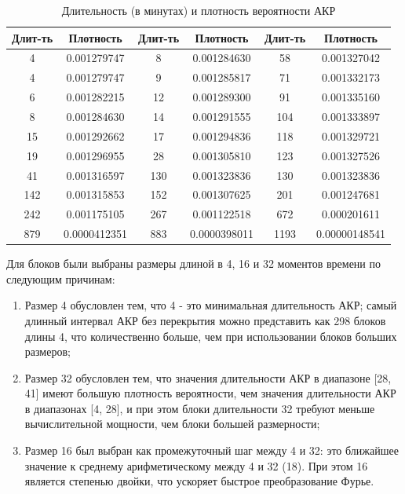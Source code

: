\documentclass[spec, och, diploma]{SCWorks}
\begin{document}
        \begin{table}[h]
            \centering
            \label{tab:akr_duration}
            \begin{tabular}{|c|c|c|c|c|c|}
            \hline
            \textbf{Длит-ть} & \textbf{Плотность} & \textbf{Длит-ть} & \textbf{Плотность} & \textbf{Длит-ть} & \textbf{Плотность} \\ \hline
            4    & 0.001279747  & 8    & 0.001284630  & 58   & 0.001327042  \\ \hline
            4    & 0.001279747  & 9    & 0.001285817  & 71   & 0.001332173  \\ \hline
            6    & 0.001282215  & 12   & 0.001289300  & 91   & 0.001335160  \\ \hline
            8    & 0.001284630  & 14   & 0.001291555  & 104  & 0.001333897  \\ \hline
            15   & 0.001292662  & 17   & 0.001294836  & 118  & 0.001329721  \\ \hline
            19   & 0.001296955  & 28   & 0.001305810  & 123  & 0.001327526  \\ \hline
            41   & 0.001316597  & 130  & 0.001323836  & 130  & 0.001323836  \\ \hline
            142  & 0.001315853  & 152  & 0.001307625  & 201  & 0.001247681  \\ \hline
            242  & 0.001175105  & 267  & 0.001122518  & 672  & 0.000201611  \\ \hline
            879  & 0.0000412351 & 883  & 0.0000398011 & 1193 & 0.00000148541 \\ \hline
            \end{tabular}
            \captionsetup{justification=centering}
            \caption{Длительность (в минутах) и плотность вероятности АКР}
        \end{table}

        Для блоков были выбраны размеры длиной в 4, 16 и 32 моментов времени по
        следующим причинам:

        \begin{enumerate}
            \item Размер 4 обусловлен тем, что 4 - это минимальная длительность
            АКР; самый длинный интервал АКР без перекрытия можно представить как
            298 блоков длины 4, что количественно больше, чем при использовании
            блоков больших размеров;
            \item Размер 32 обусловлен тем, что значения длительности АКР в
            диапазоне [28, 41] имеют большую плотность вероятности, чем значения
            длительности АКР в диапазонах [4, 28], и при этом блоки длительности
            32 требуют меньше вычислительной мощности, чем блоки большей
            размерности;
            \item Размер 16 был выбран как промежуточный шаг между 4 и 32: это
            ближайшее значение к среднему арифметическому между 4 и 32 (18). При
            этом 16 является степенью двойки, что ускоряет быстрое
            преобразование Фурье.
        \end{enumerate}
\end{document}
